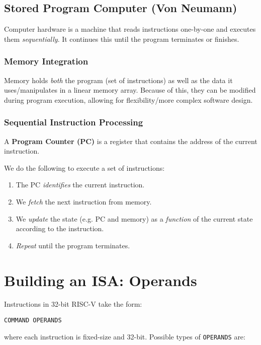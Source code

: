 \documentclass{report}
\newcommand{\definition}[2]{\begin{tcolorbox}[title={Definition: #1}]{#2}\end{tcolorbox}}
\begin{document}
\subsection{Stored Program Computer (Von Neumann)}
\definition{Von Neumann Architecture}{
  Computer hardware is a machine that reads instructions one-by-one and executes them
  \textit{sequentially}. It continues this until the program terminates or finishes.
}

\subsubsection{Memory Integration}
Memory holds \textit{both} the program (set of instructions) as well as the data it uses/manipulates
in a linear memory array. Because of this, they can be modified during program execution, allowing
for flexibility/more complex software design.

\subsubsection{Sequential Instruction Processing}
\definition{Program Counter}{
  A \textbf{Program Counter (PC)} is a register that contains the address of the current instruction.
}

We do the following to execute a set of instructions:

\begin{enumerate}[label=\textit{(\roman*)}] 
\item The PC \textit{identifies} the current instruction.
\item We \textit{fetch} the next instruction from memory.
\item We \textit{update} the state (e.g. PC and memory) as a \textit{function} of the current state
  according to the instruction.
\item \textit{Repeat} until the program terminates.
\end{enumerate}





\section{Building an ISA: Operands}
Instructions in 32-bit RISC-V take the form:
\begin{center}
  \texttt{COMMAND OPERANDS}
\end{center}
where each instruction is fixed-size and 32-bit. Possible types of \texttt{OPERANDS} are:
\end{document}

